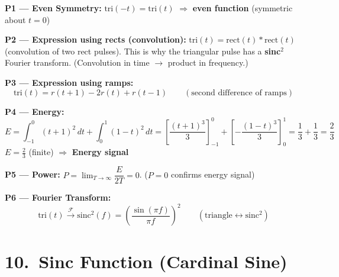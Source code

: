 \documentclass[10pt,a4paper]{article}
\begin{document}
\begin{center}
\end{center}

\begin{propbox}
\textbf{P1 --- Even Symmetry:}
$\text{tri}(-t) = \text{tri}(t)$ $\Rightarrow$ \textbf{even function} (symmetric about $t=0$)

\medskip
\textbf{P2 --- Expression using rects (convolution):}
$\text{tri}(t) = \text{rect}(t) * \text{rect}(t)$ (convolution of two rect pulses).
This is why the triangular pulse has a \textbf{sinc}$^2$ Fourier transform. (Convolution in time $\to$ product in frequency.)

\medskip
\textbf{P3 --- Expression using ramps:}
\[
  \text{tri}(t) = r(t+1) - 2r(t) + r(t-1) \qquad (\text{second difference of ramps})
\]

\medskip
\textbf{P4 --- Energy:}
\[
  E = \int_{-1}^{0}(t+1)^2\,dt + \int_{0}^{1}(1-t)^2\,dt
    = \left[\frac{(t+1)^3}{3}\right]_{-1}^{0}+\left[-\frac{(1-t)^3}{3}\right]_{0}^{1}
    = \frac{1}{3}+\frac{1}{3} = \frac{2}{3}
\]
$E=\tfrac{2}{3}$ (finite) $\Rightarrow$ \textbf{Energy signal}

\medskip
\textbf{P5 --- Power:} $P = \lim_{T\to\infty}\dfrac{E}{2T} = 0$. \quad ($P=0$ confirms energy signal)

\medskip
\textbf{P6 --- Fourier Transform:}
\[
  \text{tri}(t) \xrightarrow{\mathcal{F}} \text{sinc}^2(f) = \left(\frac{\sin(\pi f)}{\pi f}\right)^2 \qquad (\text{triangle}\leftrightarrow\text{sinc}^2)
\]
\end{propbox}

\section{10.\ Sinc Function (Cardinal Sine)}
\end{document}
